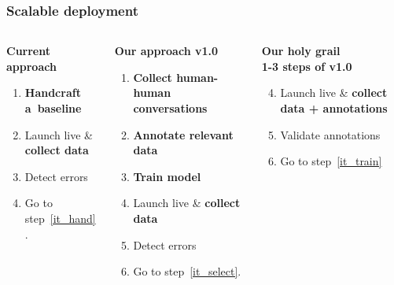 \documentclass[10pt, compress,british,xcolor={svgnames,dvipsnames,x11names},trans]{beamer}
\begin{document}
\begin{frame}\frametitle{Scalable deployment}
\begin{columns}
\begin{column}{0.33\textwidth}
    {\bf Current approach } \\
    \begin{enumerate}
        \item\label{it_hand} {\bf \color{red} Handcraft a~baseline}
        \item Launch live \& {\bf collect data}
        \item Detect errors
        \item Go to step~\ref{it_hand}.
    \end{enumerate}
\end{column}
\begin{column}{0.33\textwidth}
    {\bf Our approach v1.0 } \\
    \begin{enumerate}
        \item {\bf \color{darkgreen} Collect human-human conversations}
        \item\label{it_select} {\bf \color{darkgreen} Annotate relevant data}
        \item\label{it_train} {\bf \color{darkgreen} Train model}
        \item Launch live \& {\bf collect data}
        \item Detect errors
        \item Go to step~\ref{it_select}.
    \end{enumerate}
\end{column}
\begin{column}{0.33\textwidth}
    {\bf Our holy grail } \\
    {\bf \color{darkgreen} 1-3 steps of v1.0} \\
    \begin{enumerate}
        \setcounter{enumi}{3}
        \item Launch live \& {\bf collect data + annotations} %
        \item Validate annotations
        \item Go to step~\ref{it_train}
    \end{enumerate}
\end{column}
\end{columns}
\end{frame}
\end{document}

